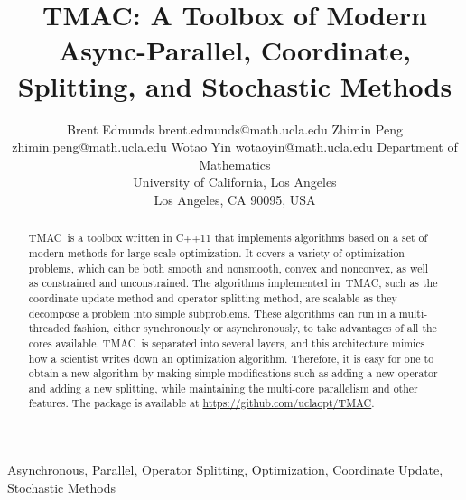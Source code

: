 \documentclass[twoside,11pt]{article}
\newcommand{\pkg}{{TMAC}}
\newcommand{\repo}{\url{https://github.com/uclaopt/TMAC}}
\begin{document}
\title{\pkg: A Toolbox of Modern Async-Parallel, Coordinate, Splitting, and Stochastic Methods}

\author{\name Brent Edmunds \email brent.edmunds@math.ucla.edu
       \AND
       \name Zhimin Peng \email zhimin.peng@math.ucla.edu
       \AND
        \name Wotao Yin \email wotaoyin@math.ucla.edu 
       \AND
       \addr Department of Mathematics\\
       University of California, Los Angeles\\
       Los Angeles, CA 90095, USA}

\maketitle

\begin{abstract}
\pkg~is a toolbox written in C++11 that implements algorithms based on a set of modern methods for large-scale optimization. It covers a variety of optimization problems, which can be both smooth and nonsmooth, convex and nonconvex, as well as constrained and unconstrained. The algorithms implemented in~\pkg, such as the coordinate update method and operator splitting method, are scalable as they decompose a problem into simple subproblems. These algorithms can run in a multi-threaded fashion, either synchronously or asynchronously, to take advantages of all the cores available. \pkg~is separated into several layers, and this architecture mimics how a scientist writes down an optimization algorithm. Therefore, it is easy for one to obtain a new algorithm by making simple modifications such as adding a new operator and adding a new splitting, while maintaining the multi-core parallelism and other features. The package is available at \repo.
\end{abstract}

\begin{keywords}
Asynchronous, Parallel, Operator Splitting, Optimization, Coordinate Update, Stochastic Methods
\end{keywords}








% 

%

%

%


% 


% 

% 

% 





\end{document}
